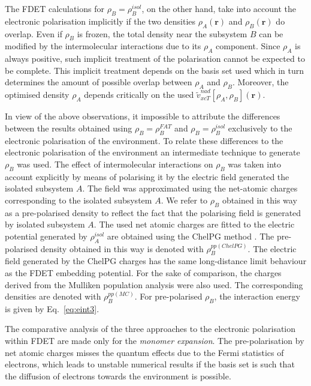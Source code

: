 \documentclass[amsmath,amssymb,preprint,aip,jcp]{revtex4-1}
\begin{document}
The FDET calculations for $\rho_B=\rho_B^{isol}$, on the other hand, take into account the electronic polarisation implicitly if the two densities $\rho_A(\mathbf{r})$ and $\rho_B(\mathbf{r})$ do overlap. 
Even if $\rho_B$ is frozen, the total density near the subsystem $B$ can be modified by the intermolecular interactions due to its $\rho_A$ component. Since $\rho_A$
is always positive, such implicit treatment of the polarisation cannot be expected to be complete. 
This implicit treatment depends on the basis set used which in turn determines the amount of possible overlap between $\rho_A$ and $\rho_B$.
Moreover, the optimised density 
$\rho_A$ depends critically on the used $\tilde{v}_{xcT}^{nad}[\rho_A,\rho_B](\mathbf{r})$. 

In view of the above observations, it impossible to attribute the differences between the results obtained using $\rho_B=\rho_B^{FAT}$ and $\rho_B=\rho_B^{isol}$ exclusively to the electronic polarisation of the environment.
To relate these differences to the electronic polarisation of the environment an intermediate technique to generate 
 $\rho_B$ was used.
The effect of intermolecular interactions on 
$\rho_B$ was taken into account explicitly
 by means of polarising it by the electric field generated the isolated subsystem $A$. 
The field was approximated using the net-atomic charges corresponding to the isolated subsystem $A$. 
We refer to $\rho_B$ obtained in this way as a pre-polarised density to reflect the fact that the polarising field is generated by isolated subsystem $A$.
The used net atomic charges are fitted to the electric potential generated by $\rho_A^{isol}$ are obtained using the ChelPG method \cite{Breneman1990}.
The pre-polarised density obtained in this way is denoted with $\rho_B^{pp(ChelPG)}$.
The electric field generated by the ChelPG charges has the same long-distance limit behaviour as the FDET embedding potential.
For the sake of comparison, the charges derived from the Mulliken population analysis \cite{Mulliken1955} were also used.
The corresponding densities are denoted with $\rho_B^{pp(MC)}$. 
For pre-polarised $\rho_B$, the interaction energy is given by Eq.~\ref{eq:eint3}.

The comparative analysis of the three approaches to the electronic polarisation within FDET
are made only for the {\it monomer expansion}. The pre-polarisation by net atomic charges misses the quantum effects due to the Fermi statistics of electrons, which leads to unstable numerical results if the basis set is such that the diffusion of electrons towards the environment is possible.\cite{Fradelos2011a,Fradelos2011c}
\end{document}
